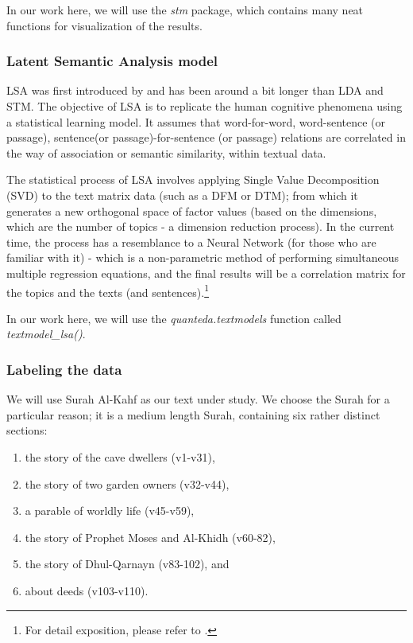 \documentclass[
]{article}
\providecommand{\tightlist}{%
  \setlength{\itemsep}{0pt}\setlength{\parskip}{0pt}}
\begin{document}
In our work here, we will use the \emph{stm} package, which contains many neat functions for visualization of the results.

\hypertarget{latent-semantic-analysis-model}{%
\subsubsection{Latent Semantic Analysis model}\label{latent-semantic-analysis-model}}

LSA was first introduced by \citep{landauer1998} and has been around a bit longer than LDA and STM. The objective of LSA is to replicate the human cognitive phenomena using a statistical learning model. It assumes that word-for-word, word-sentence (or passage), sentence(or passage)-for-sentence (or passage) relations are correlated in the way of association or semantic similarity, within textual data.

The statistical process of LSA involves applying Single Value Decomposition (SVD) to the text matrix data (such as a DFM or DTM); from which it generates a new orthogonal space of factor values (based on the dimensions, which are the number of topics - a dimension reduction process). In the current time, the process has a resemblance to a Neural Network (for those who are familiar with it) - which is a non-parametric method of performing simultaneous multiple regression equations, and the final results will be a correlation matrix for the topics and the texts (and sentences).\footnote{For detail exposition, please refer to \citep{landauer1998}.}

In our work here, we will use the \emph{quanteda.textmodels} function called \emph{textmodel\_lsa()}.

\hypertarget{labeling-the-data}{%
\subsubsection{Labeling the data}\label{labeling-the-data}}

We will use Surah Al-Kahf as our text under study. We choose the Surah for a particular reason; it is a medium length Surah, containing six rather distinct sections:

\begin{enumerate}
\def\labelenumi{\arabic{enumi})}
\tightlist
\item
  the story of the cave dwellers (v1-v31),
\item
  the story of two garden owners (v32-v44),
\item
  a parable of worldly life (v45-v59),
\item
  the story of Prophet Moses and Al-Khidh (v60-82),
\item
  the story of Dhul-Qarnayn (v83-102), and
\item
  about deeds (v103-v110).
\end{enumerate}
\end{document}
